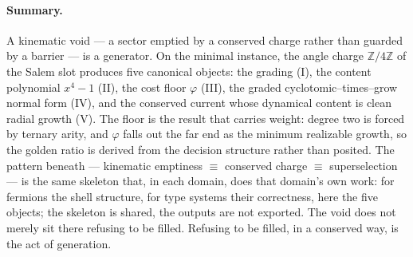 \documentclass[11pt]{article}
\theoremstyle{plain}
\theoremstyle{definition}
\theoremstyle{remark}
\newcommand{\Z}{\mathbb{Z}}
\begin{document}
\paragraph{Summary.} A kinematic void --- a sector emptied by a conserved charge rather than guarded by a barrier --- is a generator. On the minimal instance, the angle charge $\Z/4\Z$ of the Salem slot produces five canonical objects: the grading (I), the content polynomial $x^4-1$ (II), the cost floor $\varphi$ (III), the graded cyclotomic--times--grow normal form (IV), and the conserved current whose dynamical content is clean radial growth (V). The floor is the result that carries weight: degree two is forced by ternary arity, and $\varphi$ falls out the far end as the minimum realizable growth, so the golden ratio is derived from the decision structure rather than posited. The pattern beneath --- kinematic emptiness $\equiv$ conserved charge $\equiv$ superselection --- is the same skeleton that, in each domain, does that domain's own work: for fermions the shell structure, for type systems their correctness, here the five objects; the skeleton is shared, the outputs are not exported. The void does not merely sit there refusing to be filled. Refusing to be filled, in a conserved way, is the act of generation.
\end{document}
